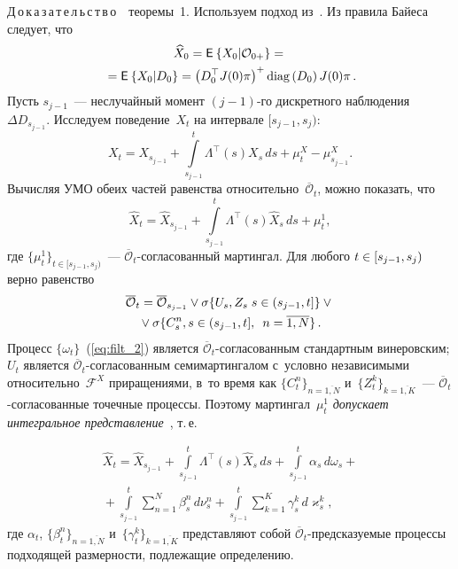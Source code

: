 \begin{multicols}{2}
{\noindent
Д\,о\,к\,а\,з\,а\,т\,е\,л\,ь\,с\,т\,в\,о\ \ теоремы~1.
Используем подход из~\cite[Part~III,~Sect.~8.7]{EAM_10}.
 Из правила Байеса следует, что
\begin{multline*}
\widehat{X}_0 = \me{}{X_0|\mathcal{O}_{0+}}\hm = {}\\
{}=\me{}{X_0|D_0}\hm= \left(D_0^{\top}J(0)\pi\right)^+
\mathrm{diag}\left(D_0\right)J(0)\pi\,.
\end{multline*}
Пусть  $s_{j-1}$~--- неслучайный момент $(j-1)$-го дискретного наблюдения~$\Delta D_{s_{j-1}}$. 
Исследуем поведение~$X_t$ на интервале $[s_{j-1}, s_{j})$:
$$
X_t = X_{s_{j-1}} + \int\limits_{s_{j-1}}^t \Lambda^{\top}(s)X_{s}\,ds
 + \mu^X_t - \mu^X_{s_{j-1}}.
$$
Вычисляя УМО обеих частей равенства относительно~$\overline{\mathcal{O}}_t$, можно показать, что
$$
\widehat{X}_t = \widehat{X}_{s_{j-1}} + \int\limits_{s_{j-1}}^t \Lambda^{\top}(s)\widehat{X}_{s}\,ds + \mu_t^1,
$$
где $\{\mu_t^1\}_{t \in [s_{j-1}, s_{j})}$~--- $\overline{\mathcal{O}}_t$-со\-гла\-со\-ван\-ный мартингал.
Для любого $t \hm\in [s_{j-1}, s_{j})$ верно равенство 
\begin{multline*}
\overline{\mathcal{O}}_{t}=
\overline{\mathcal{O}}_{s_{j-1}} \vee \sigma\{U_s,Z_s\;s  \in (s_{j-1},t]\} 
\vee{}\\
{}\vee \sigma\{C_s^n, s \in (s_{j-1},t],\enskip n=\overline{1,N}\}\,.
\end{multline*}
Процесс $\{\omega_t\}$~(\ref{eq:filt_2})  является $\overline{\mathcal{O}}_t$-со\-гла\-со\-ван\-ным 
стандартным винеровским;
$U_t$ является $\overline{\mathcal{O}}_t$-со\-гла\-со\-ван\-ным семимартингалом 
с~условно независимыми относительно~$\mathcal{F}^X$ приращениями, в~то время 
как $\{C^n_t\}_{n=\overline{1,N}}$ и~$\{Z^k_t\}_{k=\overline{1,K}}$~--- 
$\overline{\mathcal{O}}_t$-со\-гла\-со\-ван\-ные точечные процессы. Поэтому мартингал~$\mu_t^1$ 
\textit{допускает интегральное представление}~\cite[Chap. 4, \S\,8, Problem~1]{LSh_89},
т.\,е.

\noindent
\begin{multline}
\widehat{X}_t = \widehat{X}_{s_{j-1}} + \int\limits_{s_{j-1}}^t \Lambda^{\top}(s)\widehat{X}_{s}\,ds
+ \int\limits_{s_{j-1}}^t \alpha_s\, d\omega_s
+{}\\
{}+ \int\limits_{s_{j-1}}^t \sum\limits_{n=1}^N\beta_s^n\, d\nu_s^n+
\int\limits_{s_{j-1}}^t \sum\limits_{k=1}^K\gamma_s^k \,d\varkappa_s^k,
\label{eq:filt_3}
\end{multline}
где $\alpha_t$, $\{\beta_t^n\}_{n=\overline{1,N}}$ и~$\{\gamma_t^k\}_{k=\overline{1,K}}$ представляют собой
$\overline{\mathcal{O}}_t$-пред\-ска\-зу\-емые процессы подходящей размерности, подлежащие определению.

}
\end{multicols}
